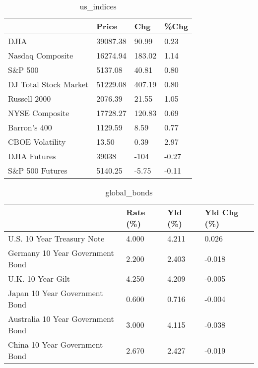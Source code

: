 \documentclass{article}%
\begin{document}
%


\begin{table}[htbp]%
\caption{us\_indices}%
\centering%
\begin{adjustbox}{width=1\textwidth}%
\begin{tabular}{llll}
\toprule
                      &    Price &    Chg &  \%Chg \\
\midrule
                 DJIA & 39087.38 &  90.99 &  0.23 \\
     Nasdaq Composite & 16274.94 & 183.02 &  1.14 \\
              S\&P 500 &  5137.08 &  40.81 &  0.80 \\
DJ Total Stock Market & 51229.08 & 407.19 &  0.80 \\
         Russell 2000 &  2076.39 &  21.55 &  1.05 \\
       NYSE Composite & 17728.27 & 120.83 &  0.69 \\
         Barron's 400 &  1129.59 &   8.59 &  0.77 \\
      CBOE Volatility &    13.50 &   0.39 &  2.97 \\
         DJIA Futures &    39038 &   -104 & -0.27 \\
      S\&P 500 Futures &  5140.25 &  -5.75 & -0.11 \\
\bottomrule
\end{tabular}
%
\end{adjustbox}%
\end{table}

%


\begin{table}[htbp]%
\caption{global\_bonds}%
\centering%
\begin{adjustbox}{width=1\textwidth}%
\begin{tabular}{llll}
\toprule
                                  & Rate (\%) & Yld (\%) & Yld Chg (\%) \\
\midrule
       U.S. 10 Year Treasury Note &    4.000 &   4.211 &       0.026 \\
  Germany 10 Year Government Bond &    2.200 &   2.403 &      -0.018 \\
                U.K. 10 Year Gilt &    4.250 &   4.209 &      -0.005 \\
    Japan 10 Year Government Bond &    0.600 &   0.716 &      -0.004 \\
Australia 10 Year Government Bond &    3.000 &   4.115 &      -0.038 \\
    China 10 Year Government Bond &    2.670 &   2.427 &      -0.019 \\
\bottomrule
\end{tabular}
%
\end{adjustbox}%
\end{table}
\end{document}
